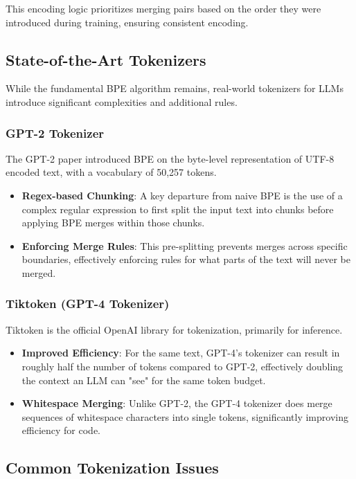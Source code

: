 This encoding logic prioritizes merging pairs based on the order they were introduced during training, ensuring consistent encoding.

\subsection{State-of-the-Art Tokenizers}

While the fundamental BPE algorithm remains, real-world tokenizers for LLMs introduce significant complexities and additional rules.

\subsubsection{GPT-2 Tokenizer}
The GPT-2 paper introduced BPE on the byte-level representation of UTF-8 encoded text, with a vocabulary of 50,257 tokens.
\begin{itemize}
    \item \textbf{Regex-based Chunking}: A key departure from naive BPE is the use of a complex regular expression to first split the input text into chunks before applying BPE merges within those chunks.
    \item \textbf{Enforcing Merge Rules}: This pre-splitting prevents merges across specific boundaries, effectively enforcing rules for what parts of the text will never be merged.
\end{itemize}

\subsubsection{Tiktoken (GPT-4 Tokenizer)}
Tiktoken is the official OpenAI library for tokenization, primarily for inference.
\begin{itemize}
    \item \textbf{Improved Efficiency}: For the same text, GPT-4's tokenizer can result in roughly half the number of tokens compared to GPT-2, effectively doubling the context an LLM can "see" for the same token budget.
    \item \textbf{Whitespace Merging}: Unlike GPT-2, the GPT-4 tokenizer does merge sequences of whitespace characters into single tokens, significantly improving efficiency for code.
\end{itemize}

\subsection{Common Tokenization Issues}

